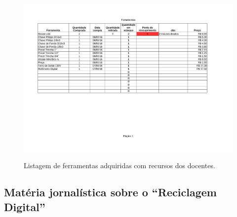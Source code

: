 \documentclass[
	12pt,				%
	openright,			%
	oneside,			%
	a4paper,			%
	english,			%
	spanish,			%
	brazil,				%
	]{abntex2}
\begin{document}
\begin{apendicesenv}
\begin{figure}
	\centering
	\includegraphics[scale=0.8, angle=90]{figuras/estoque-ferramentas.pdf} 
	\label{tabela:estoque}
	\caption{Listagem de ferramentas adquiridas com recursos dos docentes.}
\end{figure}

\end{apendicesenv}


\begin{anexosenv}

\partanexos

 \chapter{Matéria jornalística sobre o ``Reciclagem Digital''} \label{apendice:materia}
 	

\end{anexosenv}
\end{document}
